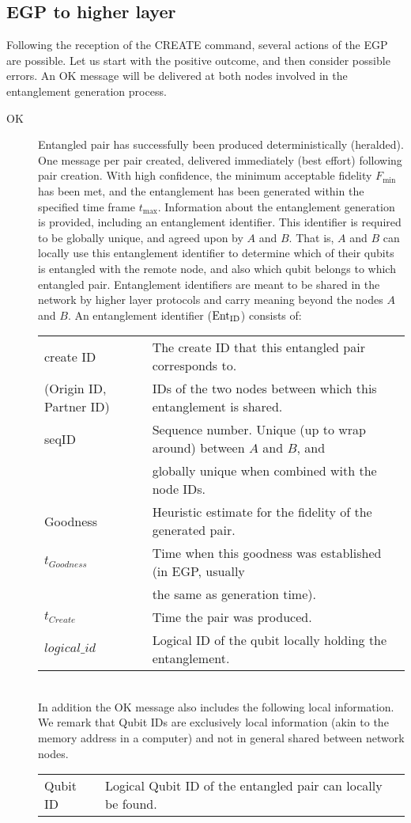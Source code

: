 \documentclass{article}
\newcommand{\entid}{{\rm Ent}_{\rm ID}}
\begin{document}
\subsection{EGP to higher layer}
Following the reception of the CREATE command, several actions of the EGP are possible. Let us start with the positive outcome, and then consider possible
errors. An OK message will be delivered at both nodes involved in the entanglement generation process.
\begin{description}
\item[OK] Entangled pair has successfully been produced deterministically (heralded). One message per pair created, delivered immediately (best effort) following pair creation.
With high confidence, the minimum acceptable fidelity $F_{\min}$ has been met, and the entanglement has been generated
within the specified time frame $t_{\max}$. Information about the entanglement generation is provided, including an entanglement identifier. This identifier is required
to be globally unique, and agreed upon by $A$ and $B$. That is, $A$ and $B$ can locally use this entanglement identifier to determine which of their qubits is entangled with the remote
node, and also which qubit belongs to which entangled pair. Entanglement identifiers are meant to be shared in the network by higher layer protocols and carry meaning beyond the nodes
$A$ and $B$. An entanglement identifier ($\entid$) consists of:\\
\noindent
\begin{tabular}{ll}
create ID & The create ID that this entangled pair corresponds to. \\
(Origin ID, Partner ID) & IDs of the two nodes between which this entanglement is shared.\\
seqID & Sequence number. Unique (up to wrap around) between $A$ and $B$, and \\
& globally unique when combined with the node IDs.\\
Goodness & Heuristic estimate for the fidelity of the generated pair.\\
$t_{Goodness}$ & Time when this goodness was established (in EGP, usually \\
& the same as generation time).\\
$t_{Create}$ & Time the pair was produced.\\
$logical\_id$ & Logical ID of the qubit locally holding the entanglement.
\end{tabular}\\

\smallskip
\noindent
In addition the OK message also includes the following local information. We remark that Qubit IDs are exclusively local information (akin to the memory address
in a computer) and not in general shared between network nodes.\\
\noindent
\begin{tabular}{ll}
Qubit ID & Logical Qubit ID of the entangled pair can locally be found.
\end{tabular}
\end{description}
\end{document}
